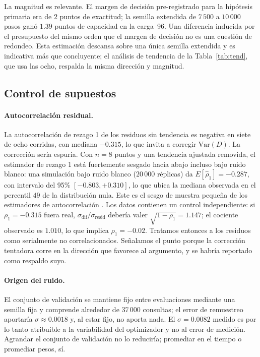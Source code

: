 \documentclass[jou,11pt,donotrepeattitle]{apa7}
\begin{document}
La magnitud es relevante. El margen de decisi\'on pre-registrado para la hip\'otesis primaria era
de $2$ puntos de exactitud; la semilla extendida de $7\,500$ a $10\,000$ pasos gan\'o $1.39$
puntos de capacidad en la carga~96. Una diferencia inducida por el presupuesto del mismo orden
que el margen de decisi\'on no es una cuesti\'on de redondeo. Esta estimaci\'on descansa sobre una
\'unica semilla extendida y es indicativa m\'as que concluyente; el an\'alisis de tendencia de la
Tabla~\ref{tab:tend}, que usa las ocho, respalda la misma direcci\'on y magnitud.

\subsection{Control de supuestos}
\label{sec:assump}

\paragraph{Autocorrelaci\'on residual.} La autocorrelaci\'on de rezago 1 de los residuos sin
tendencia es negativa en siete de ocho corridas, con mediana $-0.315$, lo que invita a corregir
$\mathrm{Var}(D)$. La correcci\'on ser\'ia espuria. Con $n = 8$ puntos y una tendencia ajustada
removida, el estimador de rezago 1 est\'a fuertemente sesgado hacia abajo incluso bajo ruido
blanco: una simulaci\'on bajo ruido blanco ($20\,000$ r\'eplicas) da
$E[\hat\rho_1] = -0.287$, con intervalo del 95\% $[-0.803, +0.310]$, lo que ubica la mediana
observada en el percentil $49$ de la distribuci\'on nula. Este es el sesgo de muestra peque\~na
de los estimadores de autocorrelaci\'on \parencite{marriott1954bias}. Los datos contienen un
control independiente: si $\rho_1 = -0.315$ fuera real,
$\sigma_{\text{dif}}/\sigma_{\text{resid}}$ deber\'ia valer $\sqrt{1-\rho_1} = 1.147$; el cociente
observado es $1.010$, lo que implica $\rho_1 = -0.02$. Tratamos entonces a los residuos como
serialmente no correlacionados. Se\~nalamos el punto porque la correcci\'on tentadora corre en la
direcci\'on que favorece al argumento, y se habr\'ia reportado como respaldo suyo.

\paragraph{Origen del ruido.} El conjunto de validaci\'on se mantiene fijo entre evaluaciones
mediante una semilla fija y comprende alrededor de $37\,000$ consultas; el error de remuestreo
aportar\'ia $\sigma \approx 0.0018$ y, al estar fijo, no aporta nada. El $\sigma = 0.0082$ medido
es por lo tanto atribuible a la variabilidad del optimizador y no al error de medici\'on.
Agrandar el conjunto de validaci\'on no lo reducir\'ia; promediar en el tiempo o promediar pesos,
s\'i.
\end{document}
